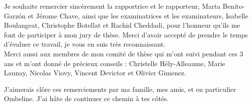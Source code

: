 {Je souhaite remercier sincèrement la rapportrice et le rapporteur, Marta Benito-Garzón et Jérome Chave, ainsi que les examinatrices et les examinateurs, Isabelle Boulangeat, Christophe Botellat et Rachid Cheddadi, pour l’honneur qu’ils me font de participer à mon jury de thèse. Merci d'avoir accepté de prendre le temps d'évaluer ce travail, je vous en suis très reconnaissant. \\
Merci aussi aux membres de mon comité de thèse qui m'ont suivi pendant ces 3 ans et m'ont donné de précieux conseils : Christelle Hély-Alleaume, Marie Launay, Nicolas Viovy, Vincent Devictor et Olivier Gimenez.

J’aimerais clôre ces remerciements par ma famille, mes amis, et en particulier Ombeline.
J'ai hâte de continuer ce chemin à tes côtés.
}

